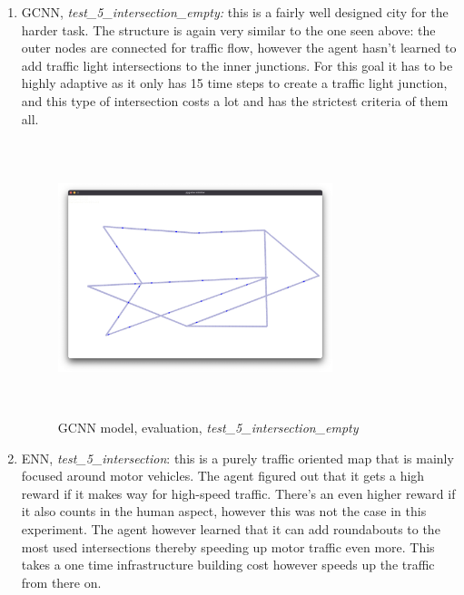 \documentclass[
]{elteikthesis}[2023/04/10]
\begin{document}
\begin{enumerate}
\begin{figure}[H]
\end{figure}
\item GCNN, \emph{test\_5\_intersection\_empty: }this is a fairly well designed
city for the harder task. The structure is again very similar to the
one seen above: the outer nodes are connected for traffic flow, however
the agent hasn't learned to add traffic light intersections to the
inner junctions. For this goal it has to be highly adaptive as it
only has 15 time steps to create a traffic light junction, and this
type of intersection costs a lot and has the strictest criteria of
them all. 
\begin{figure}[H]
\begin{centering}
\includegraphics[width=8cm,height=8cm,keepaspectratio]{images/city_agent_gcnn_2023-04-29_18-06_test_5_intersection_empty}
\par\end{centering}
\caption{GCNN model, evaluation, \emph{test\_5\_intersection\_empty}}
\end{figure}
\item ENN, \emph{test\_5\_intersection}: this is a purely traffic oriented
map that is mainly focused around motor vehicles. The agent figured
out that it gets a high reward if it makes way for high-speed traffic.
There's an even higher reward if it also counts in the human aspect,
however this was not the case in this experiment. The agent however
learned that it can add roundabouts to the most used intersections
thereby speeding up motor traffic even more. This takes a one time
infrastructure building cost however speeds up the traffic from there
on. 
\begin{figure}[H]
\begin{centering}

\end{centering}
\end{figure}
\end{enumerate}
\end{document}

